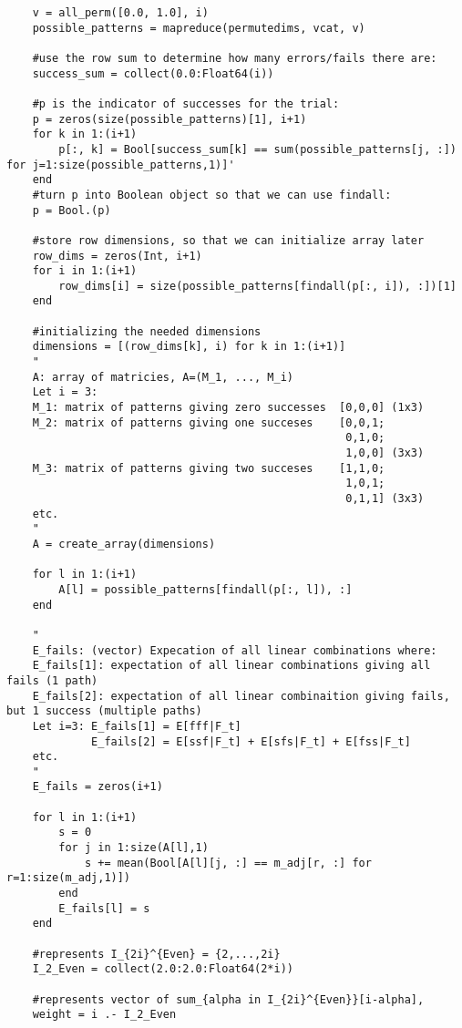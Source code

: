 \begin{verbatim}
    v = all_perm([0.0, 1.0], i)
    possible_patterns = mapreduce(permutedims, vcat, v)
    
    #use the row sum to determine how many errors/fails there are:
    success_sum = collect(0.0:Float64(i))
    
    #p is the indicator of successes for the trial:
    p = zeros(size(possible_patterns)[1], i+1)
    for k in 1:(i+1)
        p[:, k] = Bool[success_sum[k] == sum(possible_patterns[j, :]) for j=1:size(possible_patterns,1)]'
    end
    #turn p into Boolean object so that we can use findall:
    p = Bool.(p)

    #store row dimensions, so that we can initialize array later
    row_dims = zeros(Int, i+1)
    for i in 1:(i+1)
        row_dims[i] = size(possible_patterns[findall(p[:, i]), :])[1]
    end
    
    #initializing the needed dimensions
    dimensions = [(row_dims[k], i) for k in 1:(i+1)] 
    " 
    A: array of matricies, A=(M_1, ..., M_i)
    Let i = 3:
    M_1: matrix of patterns giving zero successes  [0,0,0] (1x3)
    M_2: matrix of patterns giving one succeses    [0,0,1;
                                                    0,1,0; 
                                                    1,0,0] (3x3)
    M_3: matrix of patterns giving two succeses    [1,1,0;
                                                    1,0,1;
                                                    0,1,1] (3x3)                                                
    etc. 
    "
    A = create_array(dimensions) 

    for l in 1:(i+1)
        A[l] = possible_patterns[findall(p[:, l]), :]
    end

    " 
    E_fails: (vector) Expecation of all linear combinations where: 
    E_fails[1]: expectation of all linear combinations giving all fails (1 path)
    E_fails[2]: expectation of all linear combinaition giving fails, but 1 success (multiple paths)
    Let i=3: E_fails[1] = E[fff|F_t]
             E_fails[2] = E[ssf|F_t] + E[sfs|F_t] + E[fss|F_t]
    etc.
    "
    E_fails = zeros(i+1)

    for l in 1:(i+1)
        s = 0 
        for j in 1:size(A[l],1)
            s += mean(Bool[A[l][j, :] == m_adj[r, :] for r=1:size(m_adj,1)])
        end
        E_fails[l] = s
    end 
    
    #represents I_{2i}^{Even} = {2,...,2i}
    I_2_Even = collect(2.0:2.0:Float64(2*i))

    #represents vector of sum_{alpha in I_{2i}^{Even}}[i-alpha], 
    weight = i .- I_2_Even


\end{verbatim}
